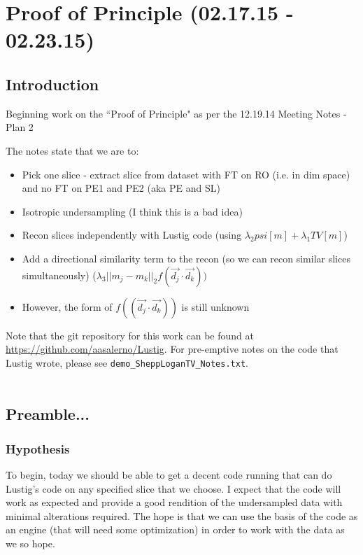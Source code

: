 \documentclass[11 pt]{article}
\let\oldsection\section
\renewcommand\section{\clearpage\newpage\oldsection}
\begin{document}
\section{Proof of Principle (02.17.15 - 02.23.15)}

  \subsection{Introduction}
    Beginning work on the ``Proof of Principle" as per the 12.19.14 Meeting Notes - Plan 2

    The notes state that we are to:
    \begin{itemize}
      \item Pick one slice - extract slice from dataset with FT on RO (i.e. in dim space) and no FT on PE1 and PE2 (aka PE and SL)
      \item Isotropic undersampling (I think this is a bad idea)
      \item Recon slices independently with Lustig code (using $\lambda_2 psi[m] + \lambda_1 TV[m]$)
      \item Add a directional similarity term to the recon (so we can recon similar slices simultaneously) ($\lambda_3 ||m_j - m_k||_2 f(\vec{d_j} \cdot \vec{d_k}))$
      \item However, the form of $f((\vec{d_j}\cdot \vec{d_k}))$ is still unknown
      \end{itemize}

    \noindent Note that the git repository for this work can be found at \url{https://github.com/aasalerno/Lustig}. For pre-emptive notes on the code that Lustig wrote, please see \verb!demo_SheppLoganTV_Notes.txt!. \\ \\

  \subsection{Preamble...}
    
    \subsubsection{Hypothesis}

        To begin, today we should be able to get a decent code running that can do Lustig's code on any specified slice that we choose. I expect that the code will work as expected and provide a good rendition of the undersampled data with minimal alterations required. The hope is that we can use the basis of the code as an engine (that will need some optimization) in order to work with the data as we so hope.
\end{document}
